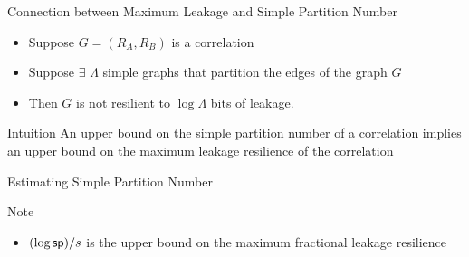 \begin{frame}{Connection between Maximum Leakage and Simple Partition Number}
	\begin{lemma}
		\begin{itemize}
			\item Suppose $ G = (R_A, R_B) $ is a correlation 
			\item Suppose $ \exists $ $\Lambda$ simple graphs that partition the edges of the graph $ G $
			\item Then $ G $ is not resilient to $ \log \Lambda $ bits of leakage.
		\end{itemize}
		
	\end{lemma}
	\pause
	
	{
	\begin{block}{Intuition}
		An upper bound on the simple partition number of a correlation implies an upper bound on the maximum leakage resilience of the correlation
	\end{block}
	}


\end{frame}

\begin{frame}{Estimating Simple Partition Number}
	
	{
		\begin{block}{Note}
			\begin{itemize}
				\item $ (\log \mathsf{sp})/s $ is the upper bound on the maximum fractional leakage resilience
			\end{itemize}
		\end{block}
	}
\end{frame}

